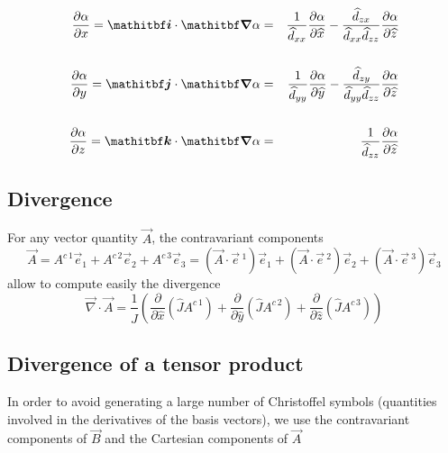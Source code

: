 \begin{eqnarray}
{\partial \alpha \over \partial x }  =
\vec{i} \cdot \vec{\nabla} \alpha & = & \dfrac{1}{\widehat{d}_{xx}}
\dfrac{\partial \alpha }{\partial \widehat{x}}- \dfrac{\widehat{d}_{zx}}{\widehat{d}_{xx}\widehat{d}_{zz}}
\dfrac{\partial \alpha }{\partial \widehat{z}}
\nonumber \\ & &\nonumber  \\
{\partial \alpha \over \partial y }  =
\vec{j} \cdot \vec{\nabla} \alpha & = & \dfrac{1}{\widehat{d}_{yy}}
\dfrac{\partial \alpha }{\partial \widehat{y}}- \dfrac{\widehat{d}_{zy}}{\widehat{d}_{yy}\widehat{d}_{zz}}
\dfrac{\partial \alpha }{\partial \widehat{z}}
\nonumber \\ & &  \\
{\partial \alpha \over \partial z }  =
\vec{k} \cdot \vec{\nabla} \alpha & = & \dfrac{1}{\widehat{d}_{zz}}
\dfrac{\partial \alpha }{\partial \widehat{z}} \nonumber
\end{eqnarray}


\subsection{Divergence}

For any vector quantity $\vec{A}$, the contravariant components
\begin{equation}
\vec{A} =A^{c \, 1}\vec{e} _{1} + A^{c \, 2}\vec{e} _{2}
 +A^{c \, 3}\vec{e} _{3} = (\vec{A} \cdot\vec{e}\, ^{1})\vec{e} _{1}
 + (\vec{A} \cdot\vec{e} \,^{2})\vec{e} _{2}
+ (\vec{A} \cdot\vec{e}\, ^{3})\vec{e} _{3}
\end{equation}
allow to compute easily the divergence
\begin{equation}
\vec{\nabla}\cdot \vec{A} = \dfrac{1}{\widehat{J}}\left(
\dfrac{\partial}{\partial \widehat{x}}(\widehat{J} A^{c \, 1})
+\dfrac{\partial}{\partial \widehat{y}}(\widehat{J} A^{c\, 2})
+\dfrac{\partial}{\partial \widehat{z}}(\widehat{J} A^{c\,  3}) \right)
\end{equation}

\subsection{Divergence of a tensor product}

In order to avoid generating a large number of Christoffel symbols (quantities
involved in the derivatives of the basis vectors), we use the
contravariant components of $\vec{B}$ and the Cartesian components of $\vec{A}$

